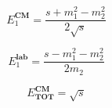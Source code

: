 \begin{theorem}
    \begin{equation}
        E^{\mathbf{CM}}_1=\frac{s+m_1^2-m_2^2}{2\sqrt s}
    \end{equation}
\end{theorem}
\begin{theorem}
    \begin{equation}
        E^{\mathbf{lab}}_1=\frac{s-m_1^2-m_2^2}{2m_2}
    \end{equation}
\end{theorem}
\begin{theorem}[质心系总能量]
    \begin{equation}
        E^{\mathbf{CM}}_{\mathbf{TOT}}=\sqrt s
    \end{equation}
\end{theorem}
